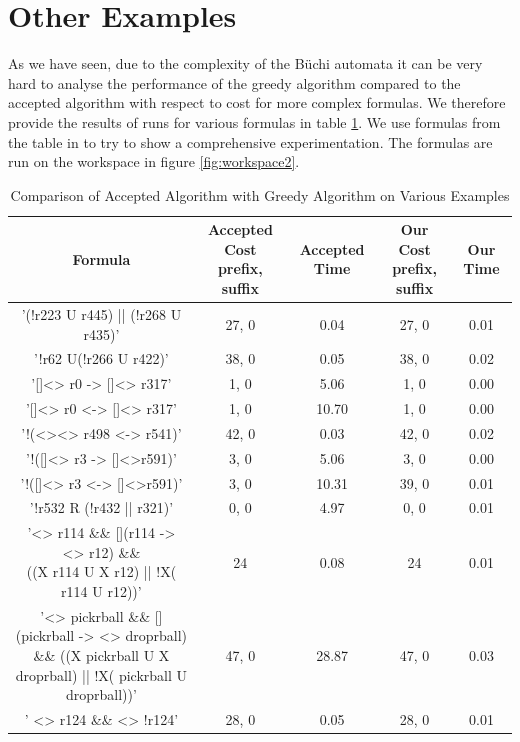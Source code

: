 \section{Other Examples}
As we have seen, due to the complexity of the B\"uchi automata it can be very hard to analyse the performance of the greedy algorithm compared to the accepted algorithm with respect to cost for more complex formulas. We therefore provide the results of runs for various formulas in table \ref{table}. We use formulas from the table in \cite{somenzi00} to try to show a comprehensive experimentation. The formulas are run on the workspace in figure \ref{fig:workspace2}. 

\begin{landscape}
\begin{table}[]
\centering
\small
\begin{tabular}{|c|c|c|c|c|}
\hline
Formula & \makecell{Accepted Cost \\ prefix, suffix} & Accepted Time & \makecell{Our Cost \\ prefix, suffix} & Our Time \\ \hline
     '(!r223 U r445) || (!r268 U r435)'  &         27, 0     &      0.04         &      27, 0   &     0.01     \\ \hline
      '!r62 U(!r266 U r422)'  &         38, 0     &       0.05        &     38, 0     &     0.02     \\ \hline
       '[]<> r0 -> []<> r317' &         1, 0      &       5.06        &    1, 0      &    0.00     \\ \hline
       '[]<> r0 <-> []<> r317'  & 1, 0		&		10.70		& 1, 0 	&  0.00 \\ \hline 
      '!(<><> r498 <-> r541)' &	42, 0	&	0.03	&	42, 0	&	0.02	\\		\hline
      '!([]<> r3 -> []<>r591)' &	 3, 0	&	5.06 	&	3, 0 	&	0.00	\\		\hline
      '!([]<> r3 <-> []<>r591)' &	 3, 0	&	10.31	&	39, 0	&	0.01	\\		\hline
      '!r532 R (!r432 || r321)' &	 0, 0	&	4.97 	&	0, 0	&	0.01 	\\		\hline
     \makecell{ '<> r114 \&\& [](r114 -> <> r12) \&\& \\((X r114 U X r12) || !X( r114 U r12))' }&	24	&	0.08 	&	24	&	0.01	\\		\hline
   \makecell{ '<> pickrball \&\& [](pickrball -> <> droprball) \\ \&\& ((X pickrball U X droprball) || !X( pickrball U droprball))' } &	47, 0	&	28.87	&	47, 0	&	0.03	\\		\hline
      ' <> r124 \&\& <> !r124' &	28, 0	&	0.05 	&	28, 0	&	0.01	\\		\hline
\end{tabular}
\caption{Comparison of Accepted Algorithm with Greedy Algorithm on Various Examples}
\label{table}
\end{table}
\end{landscape}

